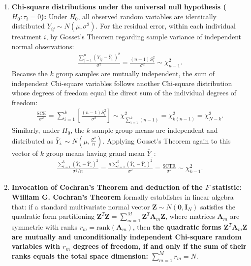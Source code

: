 \begin{solproblema}
\begin{enumerate}
		\item \textbf{Chi-square distributions under the universal null hypothesis ($H_0: \tau_i = 0$):}
		Under $H_0$, all observed random variables are identically distributed $Y_{ij} \sim N(\mu, \sigma^2)$.
		For the residual error, within each individual treatment $i$, by Gosset's Theorem regarding sample variance of independent normal observations:
		\begin{align}
			\frac{\sum_{j=1}^n (Y_{ij} - \bar{Y}_{i.})^2}{\sigma^2} = \frac{(n-1)S_i^2}{\sigma^2} \sim \chi^2_{n-1}.
		\end{align}
		Because the $k$ group samples are mutually independent, the sum of independent Chi-square variables follows another Chi-square distribution whose degrees of freedom equal the direct sum of the individual degrees of freedom:
		\begin{align}
			\frac{\text{SCE}}{\sigma^2} = \sum_{i=1}^k \left[ \frac{(n-1)S_i^2}{\sigma^2} \right] \sim \chi^2_{\sum_{i=1}^k (n-1)} = \chi^2_{k(n-1)} = \chi^2_{N-k}.
		\end{align}
		Similarly, under $H_0$, the $k$ sample group means are independent and distributed as $\bar{Y}_{i.} \sim N\left(\mu, \frac{\sigma^2}{n}\right)$. Applying Gosset's Theorem again to this vector of $k$ group means having grand mean $\bar{Y}_{..}$:
		\begin{align}
			\frac{\sum_{i=1}^k (\bar{Y}_{i.} - \bar{Y}_{..})^2}{\sigma^2 / n} = \frac{n \sum_{i=1}^k (\bar{Y}_{i.} - \bar{Y}_{..})^2}{\sigma^2} = \frac{\text{SCTR}}{\sigma^2} \sim \chi^2_{k-1}.
		\end{align}
		
		\item \textbf{Invocation of Cochran's Theorem and deduction of the $F$ statistic:}
		\textbf{William G. Cochran's Theorem} formally establishes in linear algebra that: if a standard multivariate normal vector $\mathbf{Z} \sim N(\mathbf{0}, \mathbf{I}_N)$ satisfies the quadratic form partitioning $\mathbf{Z}^T \mathbf{Z} = \sum_{m=1}^M \mathbf{Z}^T \mathbf{A}_m \mathbf{Z}$, where matrices $\mathbf{A}_m$ are symmetric with ranks $r_m = \text{rank}(\mathbf{A}_m)$, then \textbf{the quadratic forms $\mathbf{Z}^T \mathbf{A}_m \mathbf{Z}$ are mutually and unconditionally independent Chi-square random variables with $r_m$ degrees of freedom, if and only if the sum of their ranks equals the total space dimension: $\sum_{m=1}^M r_m = N$}.
		

\end{enumerate}
\end{solproblema}
